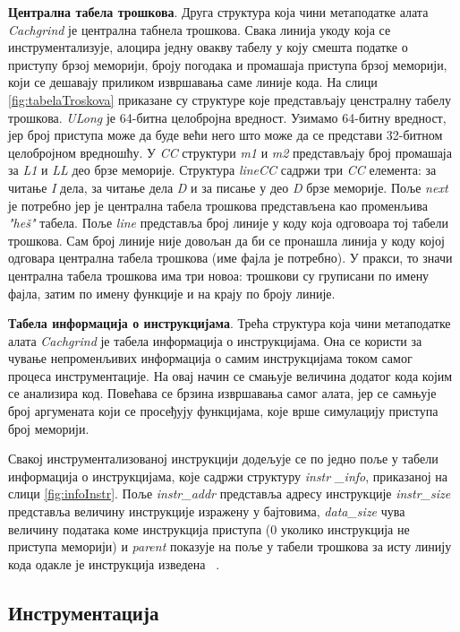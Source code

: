 \documentclass[12pt,oneside]{memoir}
\begin{document}
\indent \textbf{Централна табела трошкова}. Друга структура која чини метаподатке алата \textit{Cachgrind} је централна табнела трошкова. Свака линија укоду која се инструментализује, алоцира једну овакву табелу у коју смешта податке о приступу брзој меморији, броју погодака и промашаја приступа брзој меморији, који се дешавају приликом извршавања саме линије кода. На слици \ref{fig:tabelaTroskova} приказане су структуре које представљају ценстралну табелу трошкова. \textit{ULong} је 64-битна целобројна вредност. Узимамо 64-битну вредност, јер број приступа може да буде већи него што може да се представи 32-битном целобројном вредношћу. У \textit{CC} структури \textit{m1} и \textit{m2} представљају број промашаја за \textit{L1} и \textit{LL} део брзе меморије. Структура \textit{lineCC} садржи три \textit{CC} елемента: за читање \textit{I} дела, за читање дела \textit{D} и за писање у део \textit{D} брзе меморије. Поље \textit{next} је потребно јер је централна табела трошкова представљена као променљива \textit{"heš"} табела. Поље \textit{line} представља број линије у коду која одговоара тој табели трошкова. Сам број линије није довољан да би се пронашла линија у коду којој одговара централна табела трошкова (име фајла је потребно). У пракси, то значи централна табела трошкова има три новоа: трошкови су груписани по имену фајла, затим по имену функције и на крају по броју линије.


\indent \textbf{Табела информација о инструкцијама}. Трећа структура која чини метаподатке алата \textit{Cachgrind} је табела информација о инструкцијама. Она се користи за чување непроменљивих информација о самим инструкцијама током самог процеса инструментације. На овај начин се смањује величина додатог кода којим се анализира код. Повећава се брзина извршавања самог алата, јер се самњује број аргумената који се просеђују функцијама, које врше симулацију приступа број меморији.


\indent Свакој инструментализованој инструкцији додељује се по једно поље у табели информација о инструкцијама, које садржи структуру \textit{instr \_info},  приказаној на слици \ref{fig:infoInstr}. Поље \textit{instr\_addr} представља адресу инструкције \textit{instr\_size} представља величину инструкције изражену у бајтовима, \textit{data\_size} чува величину података коме инструкција приступа (0 уколико инструкција не приступа меморији) и \textit{parent} показује на поље у табели трошкова за исту линију кода одакле је инструкција изведена ~\cite{cachegrindRef}.

\subsection{Инструментација}
\end{document}
